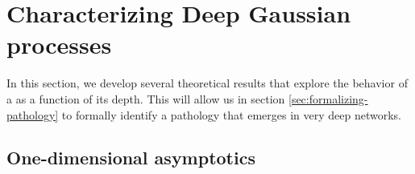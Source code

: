 \documentclass[twoside]{article}
\makeatletter
\newlength{\nonHumbleHeight}
\def\@humbleformat#1{{\settoheight{\nonHumbleHeight}{#1}\resizebox{!}{0.94\nonHumbleHeight}{#1}}}%
\newcommand\humble[1]{{\@humbleformat{#1}}}%
\newcommand{\gp}{{\humble{GP}}}
\newcommand{\sectiondist}{}
\makeatother
\begin{document}
\section{Characterizing Deep Gaussian processes}
\sectiondist
\label{sec:characterizing-deep-gps}

In this section, we develop several theoretical results that explore the behavior of a \gp{} as a function of its depth.  This will allow us in section \ref{sec:formalizing-pathology} to formally identify a pathology that emerges in very deep networks.


\subsection{One-dimensional asymptotics}
\sectiondist
\label{sec:1d}

\end{document}

